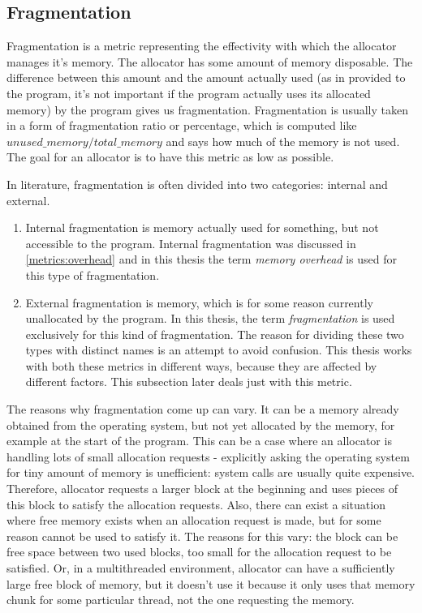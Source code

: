 \subsection{Fragmentation}
\label{metrics:fragmentation}

Fragmentation is a metric representing the effectivity with which the allocator
manages it's memory. The allocator has some amount of memory disposable. The
difference between this amount and the amount actually used (as in provided to
the program, it's not important if the program actually uses its allocated
memory) by the program gives us fragmentation. Fragmentation is usually taken in
a form of fragmentation ratio or percentage, which is computed like
$unused\_memory / total\_memory$ and says how much of the memory is not used. The
goal for an allocator is to have this metric as low as possible.

In literature, fragmentation is often divided into two categories: internal and
external.
\begin{enumerate}
\item Internal fragmentation is memory actually used for something, but not
accessible to the program. Internal fragmentation was discussed in
\ref{metrics:overhead} and in this thesis the term {\em memory overhead} is used
for this type of fragmentation.
\item External fragmentation is memory, which is for some reason currently
unallocated by the program. In this thesis, the term {\em fragmentation} is used
exclusively for this kind of fragmentation. The reason for dividing these two
types with distinct names is an attempt to avoid confusion. This thesis works
with both these metrics in different ways, because they are affected by different
factors. This subsection later deals just with this metric.
\end{enumerate}

The reasons why fragmentation come up can vary. It can be a memory already
obtained from the operating system, but not yet allocated by the memory, for
example at the start of the program. This can be a case where an allocator is
handling lots of small allocation requests - explicitly asking the operating
system for tiny amount of memory is unefficient: system calls are usually quite
expensive. Therefore, allocator requests a larger block at the beginning and uses
pieces of this block to satisfy the allocation requests. Also, there can exist a
situation where free memory exists when an allocation request is made, but for
some reason cannot be used to satisfy it. The reasons for this vary: the block
can be free space between two used blocks, too small for the allocation request
to be satisfied. Or, in a multithreaded environment, allocator can have a
sufficiently large free block of memory, but it doesn't use it because it only
uses that memory chunk for some particular thread, not the one requesting the
memory.

